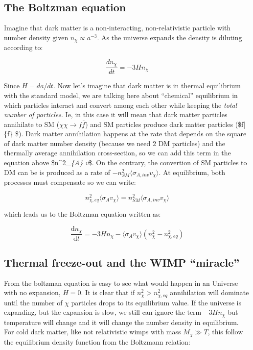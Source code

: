 \documentclass[
  letterpaper,
  DIV=11,
  numbers=noendperiod]{scrreprt}
\begin{document}
\subsection{The Boltzman equation}\label{the-boltzman-equation}

Imagine that dark matter is a non-interacting, non-relativistic particle
with number density given \(n_\chi \propto a^{-3}\). As the universe
expands the density is diluting according to:

\[\frac{d n_\chi}{dt} = - 3 H n_\chi\]

Since \(H = da/dt\). Now let's imagine that dark matter is in thermal
equilibrium with the standard model, we are talking here about
``chemical'' equilibrium in which particles interact and convert among
each other while keeping the \emph{total number of particles}. Ie, in
this case it will mean that dark matter particles annihilate to SM
(\(\chi \chi \rightarrow f\bar{f}\)) and SM particles produce dark
matter particles (\$f\bar\{f\} \rightarrow \chi \chi \$). Dark matter
annihilation happens at the rate that depends on the square of dark
matter number density (because we need 2 DM particles) and the thermally
average annihilation cross-section, so we can add this term in the
equation above \$n\^{}2\_\chi \langle \sigma\emph{\{A\}
v}\chi \rangle \$. On the contrary, the convertion of SM particles to DM
can be is produced as a rate of
\(-n^2_{SM} \langle \sigma_{A,inv} v_\chi \rangle\). At equilibrium,
both processes must compensate so we can write:

\[n^2_{\chi, eq} \langle \sigma_{A} v_\chi \rangle = n^2_{SM} \langle \sigma_{A,inv} v_\chi \rangle\]

which leads us to the Boltzman equation written as:

\[\frac{\mathrm{d} n_\chi}{\mathrm{d}t} = - 3 H n_\chi  - \langle \sigma_{A} v_\chi \rangle (n^2_\chi - n^2_{\chi, eq})\]

\subsection{Thermal freeze-out and the WIMP
``miracle''}\label{thermal-freeze-out-and-the-wimp-miracle}

From the boltzman equation is easy to see what would happen in an
Universe with no expansion, \(H = 0\). It is clear that if
\(n^2_\chi > n^2_{\chi,eq}\) annihilation will dominate until the number
of \(\chi\) particles drops to its equilibrium value. If the universe is
expanding, but the expansion is slow, we still can ignore the term
\(-3Hn_\chi\) but temperature will change and it will change the number
density in equilibrium. For cold dark matter, like not relativistic
wimps with mass \(M_\chi \gg T\), this follow the equilibrium density
function from the Boltzmann relation:
\end{document}
